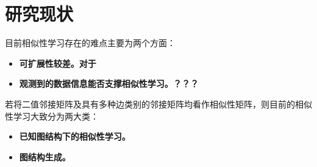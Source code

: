 \section{研究现状}

目前相似性学习存在的难点主要为两个方面：
\begin{itemize}
    \item \bf{可扩展性较差}。对于
    \item \bf{观测到的数据信息能否支撑相似性学习}。？？？
\end{itemize}

若将二值邻接矩阵及具有多种边类别的邻接矩阵均看作相似性矩阵，则目前的相似性学习大致分为两大类：

\begin{itemize}
    \item \bf{已知图结构下的相似性学习}。
    \item \bf{图结构生成}。
\end{itemize}


